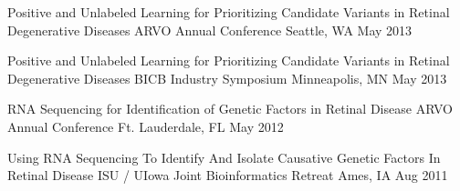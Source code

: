 \poster
{Positive and Unlabeled Learning for Prioritizing Candidate Variants in Retinal Degenerative Diseases}
{ARVO Annual Conference}
{Seattle, WA}
{May 2013}

\poster
{Positive and Unlabeled Learning for Prioritizing Candidate Variants in Retinal Degenerative Diseases}
{BICB Industry Symposium}
{Minneapolis, MN}
{May 2013}

\poster
{RNA Sequencing for Identification of Genetic Factors in Retinal Disease}
{ARVO Annual Conference}
{Ft. Lauderdale, FL}
{May 2012}

\poster
{Using RNA Sequencing To Identify And Isolate Causative Genetic Factors In Retinal Disease}
{ISU / UIowa Joint Bioinformatics Retreat}
{Ames, IA}
{Aug 2011}





